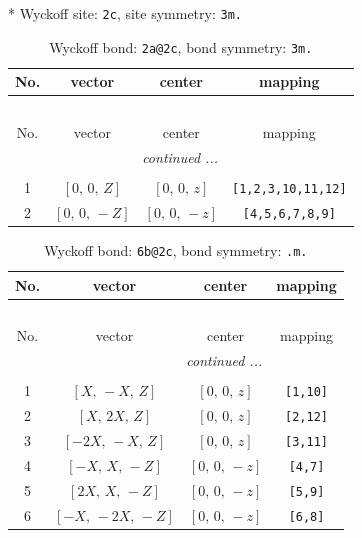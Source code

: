 \documentclass[fleqn,8pt]{jsarticle}
\begin{document}
* Wyckoff site: {\tt 2c}, site symmetry: {\tt 3m.}
\renewcommand{\arraystretch}{1.2}
\begin{longtable}{cccc}
\caption{Wyckoff bond: {\tt 2a@2c}, bond symmetry: {\tt 3m.}}
 \\
 \hline \hline
No. & vector & center & mapping \\ \hline \endfirsthead

\multicolumn{3}{l}{\tablename\ \thetable{}} \\
 \hline \hline
No. & vector & center & mapping \\ \hline \endhead

 \hline \hline
\multicolumn{3}{r}{\footnotesize\it continued ...} \\ \endfoot

 \hline \hline
\multicolumn{3}{r}{} \\ \endlastfoot

1 & $\left[ 0,\, 0,\, Z \right]$ & $\left[ 0,\, 0,\, z \right]$ & {\tt [1,2,3,10,11,12]} \\ \hline
2 & $\left[ 0,\, 0,\, - Z \right]$ & $\left[ 0,\, 0,\, - z \right]$ & {\tt [4,5,6,7,8,9]} \\
\end{longtable}
\renewcommand{\arraystretch}{1.2}
\begin{longtable}{cccc}
\caption{Wyckoff bond: {\tt 6b@2c}, bond symmetry: {\tt .m.}}
 \\
 \hline \hline
No. & vector & center & mapping \\ \hline \endfirsthead

\multicolumn{3}{l}{\tablename\ \thetable{}} \\
 \hline \hline
No. & vector & center & mapping \\ \hline \endhead

 \hline \hline
\multicolumn{3}{r}{\footnotesize\it continued ...} \\ \endfoot

 \hline \hline
\multicolumn{3}{r}{} \\ \endlastfoot

1 & $\left[ X,\, - X,\, Z \right]$ & $\left[ 0,\, 0,\, z \right]$ & {\tt [1,10]} \\ \hline
2 & $\left[ X,\, 2 X,\, Z \right]$ & $\left[ 0,\, 0,\, z \right]$ & {\tt [2,12]} \\ \hline
3 & $\left[ - 2 X,\, - X,\, Z \right]$ & $\left[ 0,\, 0,\, z \right]$ & {\tt [3,11]} \\ \hline
4 & $\left[ - X,\, X,\, - Z \right]$ & $\left[ 0,\, 0,\, - z \right]$ & {\tt [4,7]} \\ \hline
5 & $\left[ 2 X,\, X,\, - Z \right]$ & $\left[ 0,\, 0,\, - z \right]$ & {\tt [5,9]} \\ \hline
6 & $\left[ - X,\, - 2 X,\, - Z \right]$ & $\left[ 0,\, 0,\, - z \right]$ & {\tt [6,8]} \\
\end{longtable}
\end{document}

